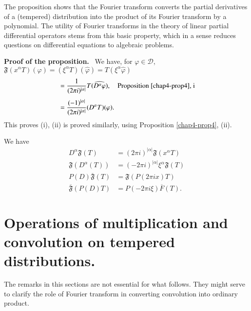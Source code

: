 \begin{remark*}
The proposition shows that the Fourier transform converts the partial derivatives of a (tempered) distribution into the product of its Fourier transform by a polynomial. The utility of Fourier transforms in the theory of linear partial differential operators stems from this basic property, which in a sense reduces questions on differential equations to algebraic problems.
\end{remark*}

\noindent
{\bf Proof of the proposition.}~
We have, for $\varphi \in \mathcal{D}$, $\mathfrak{F}(x^{\alpha}T)(\varphi)=(\xi^{\alpha}T)(\widehat{\varphi})=T(\xi^{\alpha}\widehat{\varphi})$
\begin{align*}
&= \frac{1}{(2\pi i)^{|\alpha|}}T(\widehat{D^{\alpha}\varphi}),\quad \text{Proposition \ref{chap4-prop4}, i}\\[4pt]
&= \frac{(-1)^{|\alpha|}}{(2\pi i)^{|\alpha|}}(D^{\alpha}T)(\varphi).
\end{align*}
This proves (i), (ii) is proved similarly, using Proposition \ref{chap4-prop4}, (ii).

\begin{remark*}
We have 
\begin{align*}
D^{\alpha}\mathfrak{F}(T) &= (2\pi i)^{|\alpha|}\mathfrak{F}(x^{\alpha}T)\\[4pt]
\mathfrak{F}(D^{\alpha}(T)) &= (-2\pi i)^{|\alpha|}\xi^{\alpha}\mathfrak{F}(T)\\[4pt]
P(D)\overline{\mathfrak{F}}(T) &= \mathfrak{F}(P(2\pi ix)T)\\[3pt]
\overline{\mathfrak{F}} (P(D)T) &= P(-2\pi i\xi)\overline{F}(T).
\end{align*}
\end{remark*}

\section*{Operations of multiplication and convolution on tempered distributions.}\pageoriginale

The remarks in this sections are not essential for what follows. They might serve to clarify the role of Fourier transform in converting convolution into ordinary product.


